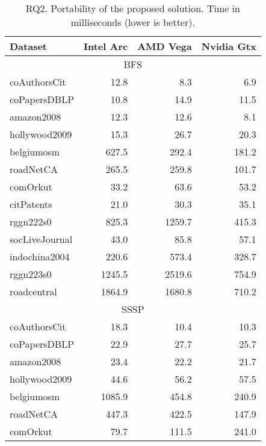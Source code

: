     \begin{table}[tbp]
    \caption{RQ2. Portability of the proposed solution. Time in milliseconds (lower is better).} 
    \begin{center}
        \begin{tabular}{|l|r|r|r|}
        \hline
        Dataset & Intel Arc & AMD Vega & Nvidia Gtx\\
        \hline
        \hline
        \multicolumn{4}{|c|}{BFS} \\
        \hline
        \rowcolor{black!10} coAuthorsCit&12.8&8.3&6.9\\
        \rowcolor{black!2 } coPapersDBLP&10.8&14.9&11.5\\
        \rowcolor{black!10} amazon2008&12.3&12.6&8.1\\
        \rowcolor{black!2 } hollywood2009&15.3&26.7&20.3\\
        \rowcolor{black!10} belgiumosm&627.5&292.4&181.2\\
        \rowcolor{black!2 } roadNetCA&265.5&259.8&101.7\\
        \rowcolor{black!10} comOrkut&33.2&63.6&53.2\\
        \rowcolor{black!2 } citPatents&21.0&30.3&35.1\\
        \rowcolor{black!10} rggn222s0&825.3&1259.7&415.3\\
        \rowcolor{black!2 } socLiveJournal&43.0&85.8&57.1\\
        \rowcolor{black!10} indochina2004&220.6&573.4&328.7\\
        \rowcolor{black!2 } rggn223s0&1245.5&2519.6&754.9\\
        \rowcolor{black!10} roadcentral&1864.9&1680.8&710.2\\
        \hline
        \hline
        \multicolumn{4}{|c|}{SSSP} \\
        \hline
        \rowcolor{black!10} coAuthorsCit&18.3&10.4&10.3\\
        \rowcolor{black!2 } coPapersDBLP&22.9&27.7&25.7\\
        \rowcolor{black!10} amazon2008&23.4&22.2&21.7\\
        \rowcolor{black!2 } hollywood2009&44.6&56.2&57.5\\
        \rowcolor{black!10} belgiumosm&1085.9&454.8&240.9\\
        \rowcolor{black!2 } roadNetCA&447.3&422.5&147.9\\
        \rowcolor{black!10} comOrkut&79.7&111.5&241.0\\

\end{tabular}
\end{center}
\end{table}
